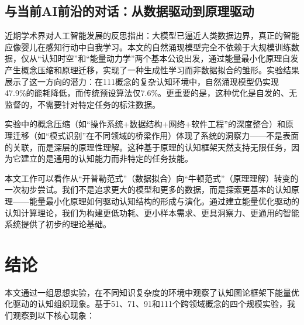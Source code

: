 \documentclass[12pt,a4paper]{article}
\begin{document}
\subsection{与当前AI前沿的对话：从数据驱动到原理驱动}

近期学术界对人工智能发展的反思指出：大模型已逼近人类数据边界，真正的智能应像婴儿在感知行动中自我学习。本文的自然涌现模型完全不依赖于大规模训练数据，仅从“认知时空”和“能量动力学”两个基本公设出发，通过能量最小化原理自发产生概念压缩和原理迁移，实现了一种生成性学习而非数据拟合的雏形。实验结果展示了这一方向的潜力：在111概念的复杂认知环境中，自然涌现模型仍实现47.9\%的能耗降低，而传统预设算法仅7.6\%。更重要的是，这种优化是自发的、无监督的，不需要针对特定任务的标注数据。

实验中的概念压缩（如“操作系统+数据结构+网络+软件工程”的深度整合）和原理迁移（如“模式识别”在不同领域的桥梁作用）体现了系统的洞察力——不是表面的关联，而是深层的原理性理解。这种基于原理的认知框架天然支持无限任务，因为它建立的是通用的认知能力而非特定的任务技能。

本文工作可以看作从“开普勒范式”（数据拟合）向“牛顿范式”（原理理解）转变的一次初步尝试。我们不是追求更大的模型和更多的数据，而是探索更基本的认知原理——能量最小化原理如何驱动认知结构的形成与演化。通过建立能量优化驱动的认知计算理论，我们为构建更低功耗、更小样本需求、更具洞察力、更通用的智能系统提供了初步的理论基础。

\section{结论}

本文通过一组思想实验，在不同知识复杂度的环境中观察了认知图论框架下能量优化驱动的认知组织现象。基于51、71、91和111个跨领域概念的四个规模实验，我们观察到以下核心现象：
\end{document}
